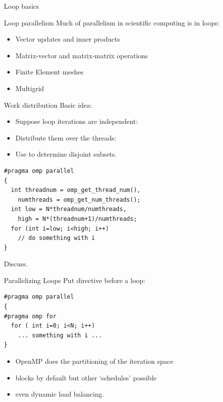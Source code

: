 
 {Loop basics}

\begin{numberedframe}{Loop parallelism}
  Much of parallelism in scientific computing is in loops:
  \begin{itemize}
  \item Vector updates and inner products
  \item Matrix-vector and matrix-matrix operations
  \item Finite Element meshes
  \item Multigrid
  \end{itemize}
\end{numberedframe}

\begin{numberedframe}{Work distribution}
  Basic idea:
  \begin{itemize}
  \item Suppose loop iterations are independent:
  \item Distribute them over the threads:
  \item Use  to determine disjoint subsets.
  \end{itemize}
\begin{lstlisting}
#pragma omp parallel
{
  int threadnum = omp_get_thread_num(),
    numthreads = omp_get_num_threads();
  int low = N*threadnum/numthreads,
    high = N*(threadnum+1)/numthreads;
  for (int i=low; i<high; i++)
    // do something with i
}
\end{lstlisting}
Discuss.
\end{numberedframe}

\begin{numberedframe}{Parallelizing Loops }
 Put  directive before a loop:
\begin{lstlisting}
#pragma omp parallel
{
#pragma omp for
  for ( int i=0; i<N; i++)
    ... something with i ...
}
\end{lstlisting}
\begin{itemize}
\item OpenMP does the partitioning of the iteration space
\item blocks by default but other `schedules' possible
\item even dynamic load balancing.
\end{itemize}
\end{numberedframe}

